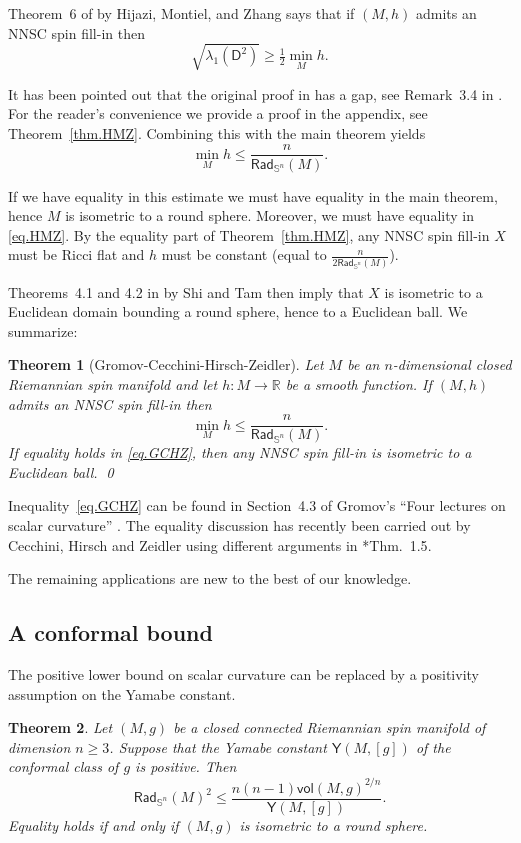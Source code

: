 \documentclass[11pt,reqno]{amsart}
\newcommand{\RadSn}{\mathsf{Rad}_{\Sn}}
\newcommand{\Sn}{\mathbb{S}^n}
\newcommand{\R}{\mathbb{R}}
\newcommand{\D}{\mathsf{D}}
\newcommand{\Y}{\mathsf{Y}}
\newcommand{\<}{\langle}
\renewcommand{\>}{\rangle}
\newcommand{\vol}{\mathsf{vol}}
\newtheorem{theorem}{Theorem}
\theoremstyle{definition}
\begin{document}
Theorem~6 of \cite{HMZ} by Hijazi, Montiel, and Zhang says that if $(M,h)$ admits an NNSC spin fill-in then
\begin{equation}
\sqrt{\lambda_1(\D^2)} \ge \tfrac12 \min_M h.
\label{eq.HMZ}
\end{equation}

It has been pointed out that the original proof in \cite{HMZ} has a gap, see Remark~3.4 in \cite{CHZ}.
For the reader's convenience we provide a proof in the appendix, see Theorem~\ref{thm.HMZ}.
Combining this with the main theorem yields
$$
\min_M h \le \frac{n}{\RadSn(M)} .
$$

If we have equality in this estimate we must have equality in the main theorem, hence $M$ is isometric to a round sphere.
Moreover, we must have equality in \eqref{eq.HMZ}. 
By the equality part of Theorem~\ref{thm.HMZ}, any NNSC spin fill-in $X$ must be Ricci flat and $h$ must be constant (equal to $\frac{n}{2\RadSn(M)}$).

Theorems~4.1 and 4.2 in \cite{ST} by Shi and Tam then imply that $X$ is isometric to a Euclidean domain bounding a round sphere, hence to a Euclidean ball. 
We summarize:

\begin{theorem}[Gromov-Cecchini-Hirsch-Zeidler]
Let $M$ be an $n$-dimensional closed Riemannian spin manifold and let $h\colon M\to\R$ be a smooth function.
If $(M,h)$ admits an NNSC spin fill-in then
\begin{equation}
\min_M h \le \frac{n}{\RadSn(M)} .
\label{eq.GCHZ}
\end{equation}
If equality holds in \eqref{eq.GCHZ}, then any NNSC spin fill-in is isometric to a Euclidean ball. 
\hfill\qed
\end{theorem}

Inequality~\eqref{eq.GCHZ} can be found in Section~4.3 of Gromov's ``Four lectures on scalar curvature'' \cite{G4}.
The equality discussion has recently been carried out by Cecchini, Hirsch and Zeidler using different arguments in \cite{CHZ}*{Thm.~1.5}.

The remaining applications are new to the best of our knowledge.


\subsection{A conformal bound}
The positive lower bound on scalar curvature can be replaced by a positivity assumption on the Yamabe constant.

\begin{theorem}
Let $(M,g)$ be a closed connected Riemannian spin manifold of dimension $n\ge3$.
Suppose that the Yamabe constant $\Y(M,[g])$ of the conformal class of $g$ is positive.
Then
\begin{equation}
\RadSn(M)^2 \le \frac{n(n-1)\vol(M,g)^{2/n}}{\Y(M,[g])} .
\label{eq.RadConform}
\end{equation}
Equality holds if and only if $(M,g)$ is isometric to a round sphere.
\end{theorem}
\end{document}
